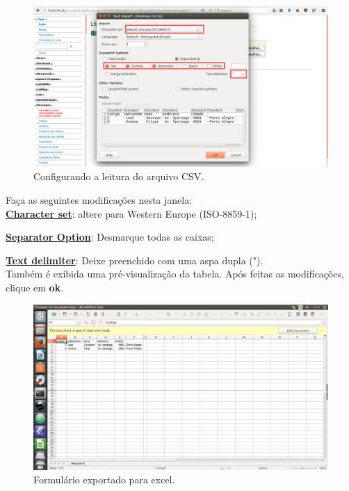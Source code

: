 \documentclass[9pt]{report}
\begin{document}
{      \begin{figure}[H]
        \includegraphics[width=\textwidth]{2_Formularios/2_Criacao_de_formularios/24.png}
        \caption{Configurando a leitura do arquivo CSV.}
        \label{fig:abrindocsv}
      \end{figure}

      Faça as seguintes modificações nesta janela:
      \\
      
      \underline{\textbf{Character set}}: altere para Western Europe
      (ISO-8859-1);

      \underline{\textbf{Separator Option}}: Desmarque todas as
      caixas;
      
      \underline{\textbf{Text delimiter}}: Deixe preenchido com uma
      aspa dupla (").
      \\

      Também é exibida uma pré-visualização da tabela. Após feitas as
      modificações, clique em \textbf{ok}.

      \begin{figure}[H]
        \includegraphics[width=\textwidth]{2_Formularios/2_Criacao_de_formularios/25.png}
        \caption{Formulário exportado para excel.}
        \label{fig:exportexcelfim}
      \end{figure}
   
}
\end{document}
